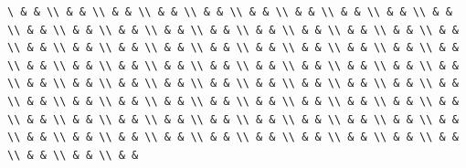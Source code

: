 \documentclass[
]{article}
\begin{document}
\begin{verbatim}
\ & & \\ & & \\ & & \\ & & \\ & & \\ & & \\ & & \\ & & \\ & & \\ & & \\ & & \\ & & \\ & & \\ & & \\ & & \\ & & \\ & & \\ & & \\ & & \\ & & \\ & & \\ & & \\ & & \\ & & \\ & & \\ & & \\ & & \\ & & \\ & & \\ & & \\ & & \\ & & \\ & & \\ & & \\ & & \\ & & \\ & & \\ & & \\ & & \\ & & \\ & & \\ & & \\ & & \\ & & \\ & & \\ & & \\ & & \\ & & \\ & & \\ & & \\ & & \\ & & \\ & & \\ & & \\ & & \\ & & \\ & & \\ & & \\ & & \\ & & \\ & & \\ & & \\ & & \\ & & \\ & & \\ & & \\ & & \\ & & \\ & & \\ & & \\ & & \\ & & \\ & & \\ & & \\ & & \\ & & \\ & & \\ & & \\ & & \\ & & \\ & & \\ & & \\ & &
\end{verbatim}
\end{document}
